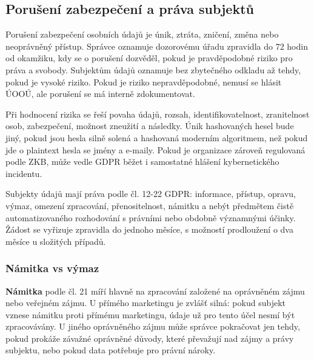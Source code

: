 

\subsection*{Porušení zabezpečení a práva subjektů}
Porušení zabezpečení osobních údajů je únik, ztráta, zničení, změna nebo neoprávněný přístup. Správce oznamuje dozorovému úřadu zpravidla do 72 hodin od okamžiku, kdy se o porušení dozvěděl, pokud je pravděpodobné riziko pro práva a svobody. Subjektům údajů oznamuje bez zbytečného odkladu až tehdy, pokud je vysoké riziko. Pokud je riziko nepravděpodobné, nemusí se hlásit ÚOOÚ, ale porušení se má interně zdokumentovat.

Při hodnocení rizika se řeší povaha údajů, rozsah, identifikovatelnost, zranitelnost osob, zabezpečení, možnost zneužití a následky. Únik hashovaných hesel bude jiný, pokud jsou hesla silně solená a hashovaná moderním algoritmem, než pokud jde o plaintext hesla se jmény a e-maily. Pokud je organizace zároveň regulovaná podle ZKB, může vedle GDPR běžet i samostatné hlášení kybernetického incidentu.

Subjekty údajů mají práva podle čl. 12-22 GDPR: informace, přístup, opravu, výmaz, omezení zpracování, přenositelnost, námitku a nebýt předmětem čistě automatizovaného rozhodování s právními nebo obdobně významnými účinky. Žádost se vyřizuje zpravidla do jednoho měsíce, s možností prodloužení o dva měsíce u složitých případů.

\subsubsection*{Námitka vs výmaz}
\textbf{Námitka} podle čl. 21 míří hlavně na zpracování založené na oprávněném zájmu nebo veřejném zájmu. U přímého marketingu je zvlášť silná: pokud subjekt vznese námitku proti přímému marketingu, údaje už pro tento účel nesmí být zpracovávány. U jiného oprávněného zájmu může správce pokračovat jen tehdy, pokud prokáže závažné oprávněné důvody, které převažují nad zájmy a právy subjektu, nebo pokud data potřebuje pro právní nároky.

